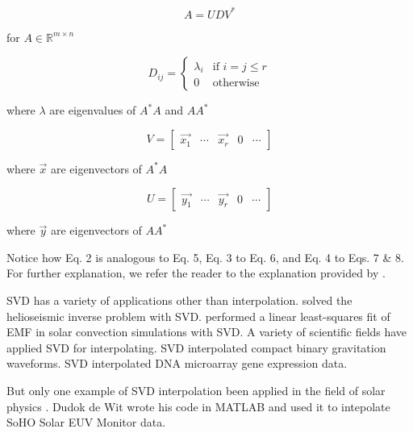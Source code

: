 \documentclass[preprint2]{aastex}
\begin{document}
\begin{equation} \label{eq:4}
A=UDV^{*}
\end{equation}
\begin{center}
for $A \in \mathbb{R}^{m \times n}$
\end{center}

\begin{equation} \label{eq:5}
D_{ij}=\begin{cases}
	\lambda_i & \text{if }i=j\leq r \\
	0 & \text{otherwise}
	\end{cases}
\end{equation}
\begin{center}
where $\lambda$ are eigenvalues of $A^*A$ and $AA^*$
\end{center}

\begin{equation} \label{eq:6}
V=\left[\begin{array}{ccccc}
\vec{x_1} & \cdots & \vec{x_r} & 0 & \cdots
\end{array} \right]
\end{equation}
\begin{center}
where $\vec{x}$ are eigenvectors of $A^*A$
\end{center}

\begin{equation} \label{eq:7}
U=\left[\begin{array}{ccccc}
\vec{y_1} & \cdots & \vec{y_r} & 0 & \cdots
\end{array} \right]
\end{equation}
\begin{center}
where $\vec{y}$ are eigenvectors of $AA^*$
\end{center}

Notice how Eq. 2 is analogous to Eq. 5, Eq. 3 to Eq. 6, and Eq. 4 to Eqs. 7 \& 8. For further explanation, we refer the reader to the explanation provided by \cite{lanc85}.

SVD has a variety of applications other than interpolation. \cite{dals93} solved the helioseismic inverse problem with SVD. \cite{raci11} performed a linear least-squares fit of EMF in solar convection simulations with SVD. A variety of scientific fields have applied SVD for interpolating. \cite{cann12} SVD interpolated compact binary gravitation waveforms. \cite{troy01} SVD interpolated DNA microarray gene expression data. 

But only one example of SVD interpolation been applied in the field of solar physics \citep{wit11}. Dudok de Wit wrote his code in MATLAB and used it to intepolate SoHO Solar EUV Monitor data.
\end{document}
